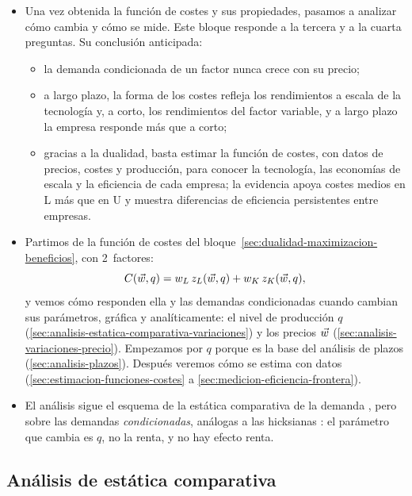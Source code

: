 \documentclass[11pt]{article}
\begin{document}
\begin{itemize}
\item Una vez obtenida la función de costes y sus propiedades, pasamos a analizar cómo cambia y cómo se mide. Este bloque responde a la tercera y a la cuarta preguntas. Su conclusión anticipada:
  \begin{itemize}
  \item la demanda condicionada de un factor nunca crece con su precio;
  \item a largo plazo, la forma de los costes refleja los rendimientos a escala de la tecnología y, a corto, los rendimientos del factor variable, y a largo plazo la empresa responde más que a corto;
  \item gracias a la dualidad, basta estimar la función de costes, con datos de precios, costes y producción, para conocer la tecnología, las economías de escala y la eficiencia de cada empresa; la evidencia apoya costes medios en L más que en U y muestra diferencias de eficiencia persistentes entre empresas.
  \end{itemize}
\item Partimos de la función de costes del bloque~\ref{sec:dualidad-maximizacion-beneficios}, con 2~factores:
  \begin{equation}
  C(\vec{w},q)=w_L\,z_L(\vec{w},q)+w_K\,z_K(\vec{w},q), \label{eq:costes-dos-factores}
  \end{equation}
  y vemos cómo responden ella y las demandas condicionadas cuando cambian sus parámetros, gráfica y analíticamente: el nivel de producción $q$ (\ref{sec:analisis-estatica-comparativa-variaciones}) y los precios $\vec{w}$ (\ref{sec:analisis-variaciones-precio}). Empezamos por $q$ porque es la base del análisis de plazos (\ref{sec:analisis-plazos}). Después veremos cómo se estima con datos (\ref{sec:estimacion-funciones-costes} a \ref{sec:medicion-eficiencia-frontera}).
\item El análisis sigue el esquema de la estática comparativa de la demanda , pero sobre las demandas \emph{condicionadas}, análogas a las hicksianas : el parámetro que cambia es $q$, no la renta, y no hay efecto renta.
\end{itemize}

\subsection{Análisis de estática comparativa}\label{sec:analisis-estatica-comparativa}
\end{document}
